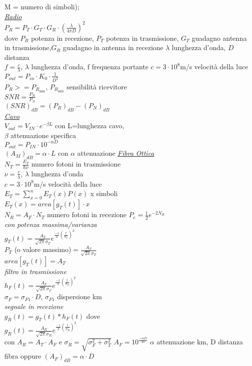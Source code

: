 \documentclass[a4paper]{article}
\begin{document}
\begin{multicols*}{3}
M = numero di simboli);\\
\underline{\textit{Radio}} \\
$P_R = P_T \cdot G_T \cdot G_R \cdot (\frac{\lambda}{4\pi D})^{2}$\\
dove $P_R$ potenza in recezione, $P_T$ potenza in trasmissione,
$G_T$ guadagno antenna in trasmissione,$G_R$ guadagno in antenna in recezione
$\lambda$ lunghezza d'onda, $D$ distanza\\
$f = \frac{c}{\lambda}$, $\lambda$ lunghezza d'onda, f frequenza portante
$c=3\cdot10^8$m/s  velocità della luce \\
$P_{out}=P_{in}\cdot K_0\cdot\frac{1}{D^2}$\\
$P_R >= P_{R_{\min}}$, $P_{R_{\min}}$ sensibilità ricevitore \\
$SNR=\frac{P_R}{P_N}$ \\
$(SNR)_{dB}=(P_R)_{dB}-(P_N)_{dB}$ \\
\underline{\textit{Cavo}} \\
$V_{out}=V_{IN}\cdot e^{-\beta L}$ con L=lunghezza cavo, \\
$\beta$ attenuazione specifica\\
$P_{out}=P_{IN}\cdot 10^{-\alpha D}$ \\
$(A_M)_{dB}=\alpha\cdot L$ con $\alpha$ attenuazione
\underline{\textit{Fibra Ottica}} \\
$N_T = \frac{E_T}{\hbar\nu}$ numero fotoni in trasmissione \\
$\nu = \frac{c}{\lambda}$, $\lambda$ lunghezza d'onda \\
$c=3\cdot10^8$m/s  velocità della luce \\
$E_T = \sum_{x=0}^{n}{E_T(x)P(x)}$ x simboli \\
$E_T(x) = area[g_T(t)]\cdot x$ \\
$N_R = A_F\cdot N_T$ numero fotoni in recezione
$P_e=\frac{1}{2}e^{-2N_R}$ \\
\textit{con potenza massima/varianza }\\
$g_T(t)=\frac{A_T}{\sqrt{2\pi}\sigma_T}e^{\frac{-1}{2}{(\frac{t}{\sigma_T})}^{2}}$
\\ $P_T$ (o valore massimo)$=\frac{A_T}{\sqrt{2\pi}\sigma_T}$ \\
$area[g_T(t)] = A_T$ \\
\textit{filtro in trasmissione }\\
$h_F(t)=\frac{A_F}{\sqrt{2\pi}\sigma_F}e^{\frac{-1}{2}{(\frac{t}{\sigma_F})}^{2}}$ \\
$\sigma_F=\sigma_{F1} \cdot D$, $\sigma_{F1}$ dispersione km\\
\textit{segnale in recezione}\\ 
$g_R(t)=g_T(t)*h_F(t)$ dove \\
$g_R(t)=\frac{A_R}{\sqrt{2\pi}\sigma_R}e^{\frac{-1}{2}{(\frac{t}{\sigma_R})}^{2}}$
\\ con $A_R = A_T \cdot A_F$ e $\sigma_R = \sqrt{\sigma_F^2 + \sigma_T^2}$
$A_F = 10^{\frac{-\alpha D}{10}}$ $\alpha$ attenuazione km, D distanza fibra
oppure ${(A_F)}_{dB}=\alpha\cdot D$
\end{multicols*}
\end{document}
